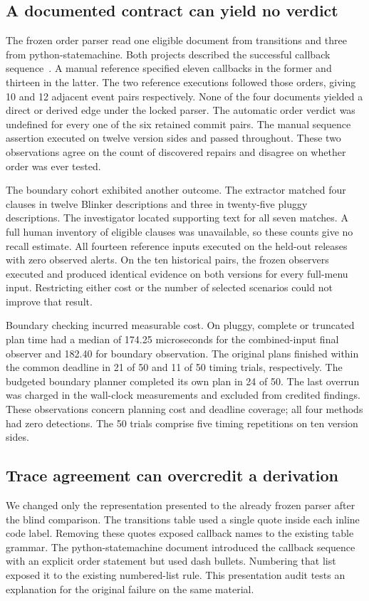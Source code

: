 \documentclass[conference]{IEEEtran}
\begin{document}
\subsection{A documented contract can yield no verdict}
The frozen order parser read one eligible document from transitions and three from python-statemachine. Both projects described the successful callback sequence~\cite{transdoc,statedoc}. A manual reference specified eleven callbacks in the former and thirteen in the latter. The two reference executions followed those orders, giving 10 and 12 adjacent event pairs respectively. None of the four documents yielded a direct or derived edge under the locked parser. The automatic order verdict was undefined for every one of the six retained commit pairs. The manual sequence assertion executed on twelve version sides and passed throughout. These two observations agree on the count of discovered repairs and disagree on whether order was ever tested.

The boundary cohort exhibited another outcome. The extractor matched four clauses in twelve Blinker descriptions and three in twenty-five pluggy descriptions. The investigator located supporting text for all seven matches. A full human inventory of eligible clauses was unavailable, so these counts give no recall estimate. All fourteen reference inputs executed on the held-out releases with zero observed alerts. On the ten historical pairs, the frozen observers executed and produced identical evidence on both versions for every full-menu input. Restricting either cost or the number of selected scenarios could not improve that result.

Boundary checking incurred measurable cost. On pluggy, complete or truncated plan time had a median of 174.25 microseconds for the combined-input final observer and 182.40 for boundary observation. The original plans finished within the common deadline in 21 of 50 and 11 of 50 timing trials, respectively. The budgeted boundary planner completed its own plan in 24 of 50. The last overrun was charged in the wall-clock measurements and excluded from credited findings. These observations concern planning cost and deadline coverage; all four methods had zero detections. The 50 trials comprise five timing repetitions on ten version sides.

\subsection{Trace agreement can overcredit a derivation}
We changed only the representation presented to the already frozen parser after the blind comparison. The transitions table used a single quote inside each inline code label. Removing these quotes exposed callback names to the existing table grammar. The python-statemachine document introduced the callback sequence with an explicit order statement but used dash bullets. Numbering that list exposed it to the existing numbered-list rule. This presentation audit tests an explanation for the original failure on the same material.
\end{document}
